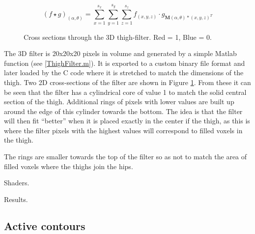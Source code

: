 \begin{equation}
	(f \star g)_{(\alpha,\theta)} = \sum_{x=1}^{s_{x}} \sum_{y=1}^{s_{y}} \sum_{z=1}^{s_{z}} f_{(x,y,z)} \cdot g_{\mathbf{M}(\alpha,\theta) * (x,y,z)^T}
\end{equation}


\begin{figure}[tb]
	\centering
	\quad
	\caption{Cross sections through the 3D thigh-filter.  Red = 1, Blue = 0.}
	\label{ThighFilterCrossSections}
\end{figure}

\bigskip
\noindent The 3D filter is 20x20x20 pixels in volume and generated by a simple Matlab function (see \ref{ThighFilter.m}).
It is exported to a custom binary file format and later loaded by the C code where it is stretched to match the dimensions of the thigh.
Two 2D cross-sections of the filter are shown in Figure \ref{ThighFilterCrossSections}.
From these it can be seen that the filter has a cylindrical core of value 1 to match the solid central section of the thigh.
Additional rings of pixels with lower values are built up around the edge of this cylinder towards the bottom.
The idea is that the filter will then fit ``better'' when it is placed exactly in the center if the thigh,
as this is where the filter pixels with the highest values will correspond to filled voxels in the thigh.

The rings are smaller towards the top of the filter so as not to match the area of filled voxels where the thighs join the hips.

\bigskip
\noindent Shaders.

Results.

\subsection{Active contours}

